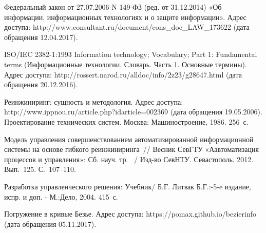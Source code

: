 \begingroup
\renewcommand{\section}[2]{\anonsection{Библиографический список}}
\begin{thebibliography}{00}

 Федеральный закон от 27.07.2006 N 149-ФЗ (ред. от 31.12.2014) «Об информации, информационных технологиях и о защите информации».
Адрес доступа: http://www.consultant.ru/document/cons\_doc\_LAW\_173622 (дата обращения 12.04.2017).

 ISO/IEC 2382-1:1993 Information technology; Vocabulary; Part 1: Fundamental terms (Информационные технологии. Словарь. Часть 1. Основные термины).
Адрес доступа: http://rossert.narod.ru/alldoc/info/2z23/g28647.html (дата обращения 20.12.2016).

 Реинжиниринг: сущность и методология. Адрес доступа: http://www.ippnou.ru/article.php?idarticle=002369 (дата обращения 19.05.2006).
 Проектирование технических систем. Москва: Машиностроение, 1986. 256~с.

 Модель управления совершенствованием автоматизированной информационной системы на основе гибкого реинжиниринга~// Весник СевГТУ «Аавтоматизация процессов и управления»: Сб. науч. тр. ~/ Изд-во СевНТУ. Севастополь. 2012. Вып.~125. С.~107--110.

 Разработка управленческого решения: Учебник/ Б.Г. Литвак Б.Г.:-5-e издание, испр. и доп. - М.:Дело, 2004. 415~с.

 Погружение в кривые Безье. Адрес доступа: https://pomax.github.io/bezierinfo (дата обращения 05.11.2017).





\end{thebibliography}
